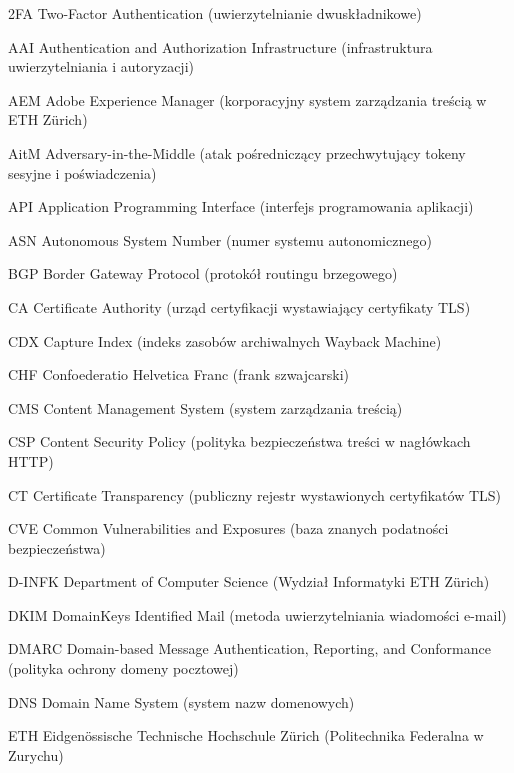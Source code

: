 \UnnumberedChapter{\abbrevname}

\begin{abbreviations}
    \item[2FA]   Two-Factor Authentication (uwierzytelnianie dwuskładnikowe)
    \item[AAI]   Authentication and Authorization Infrastructure (infrastruktura uwierzytelniania i autoryzacji)
    \item[AEM]   Adobe Experience Manager (korporacyjny system zarządzania treścią w ETH Zürich)
    \item[AitM]  Adversary-in-the-Middle (atak pośredniczący przechwytujący tokeny sesyjne i poświadczenia)
    \item[API]   Application Programming Interface (interfejs programowania aplikacji)
    \item[ASN]   Autonomous System Number (numer systemu autonomicznego)
    \item[BGP]   Border Gateway Protocol (protokół routingu brzegowego)
    \item[CA]    Certificate Authority (urząd certyfikacji wystawiający certyfikaty TLS)
    \item[CDX]   Capture Index (indeks zasobów archiwalnych Wayback Machine)
    \item[CHF]   Confoederatio Helvetica Franc (frank szwajcarski)
    \item[CMS]   Content Management System (system zarządzania treścią)
    \item[CSP]   Content Security Policy (polityka bezpieczeństwa treści w nagłówkach HTTP)
    \item[CT]    Certificate Transparency (publiczny rejestr wystawionych certyfikatów TLS)
    \item[CVE]   Common Vulnerabilities and Exposures (baza znanych podatności bezpieczeństwa)
    \item[D-INFK] Department of Computer Science (Wydział Informatyki ETH Zürich)
    \item[DKIM]  DomainKeys Identified Mail (metoda uwierzytelniania wiadomości e-mail)
    \item[DMARC] Domain-based Message Authentication, Reporting, and Conformance (polityka ochrony domeny pocztowej)
    \item[DNS]   Domain Name System (system nazw domenowych)
    \item[ETH]   Eidgenössische Technische Hochschule Zürich (Politechnika Federalna w Zurychu)

\end{abbreviations}
